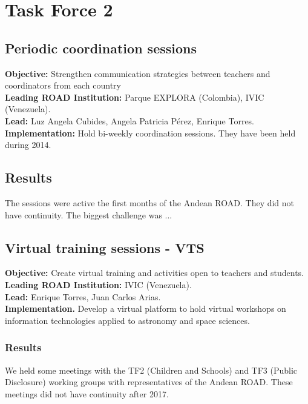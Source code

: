 \newpage
\section{Task Force 2}
\label{chapter3}

\subsection{Periodic coordination sessions}
\textbf{Objective:} Strengthen communication strategies between
teachers and coordinators from each country 
\\
\textbf{Leading ROAD Institution:} Parque EXPLORA (Colombia), IVIC
(Venezuela). 
\\
\textbf{Lead:} Luz Angela Cubides, Angela Patricia Pérez, Enrique Torres.
\\  
\textbf{Implementation:} Hold bi-weekly coordination sessions. They
have been held during 2014. 

\subsection{Results}
The sessions were active the first months of the Andean ROAD. 
They did not have continuity. 
The biggest challenge was ...





\subsection{Virtual training sessions - VTS}
\textbf{Objective:} Create virtual training and activities open to
teachers and students. 
\\
\textbf{Leading ROAD Institution:} IVIC (Venezuela).
\\
\textbf{Lead:} Enrique Torres, Juan Carlos Arias.
\\
\textbf{Implementation.} Develop a virtual platform to hold virtual
workshops on information technologies applied to astronomy and space
sciences. 

\subsubsection{Results}

We held some meetings with the TF2 (Children and Schools) and TF3
(Public Disclosure) working groups with representatives of the Andean
ROAD. 
These meetings did not have continuity after 2017.



